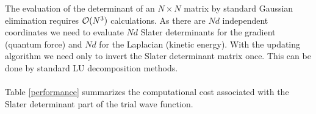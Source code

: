 The evaluation of the determinant of an $N \times N$ matrix by standard Gaussian elimination requires ${\cal O}(N^3)$
calculations. As there are $Nd$ independent coordinates we need to evaluate $Nd$ Slater determinants for the gradient (quantum force) and $Nd$ for the Laplacian (kinetic energy). With the updating algorithm we need only to invert the Slater determinant matrix once. This can be done by standard LU decomposition methods.\\
\\
\noindent
Table \ref{performance} summarizes the computational cost associated with the Slater determinant part of the trial wave function.

